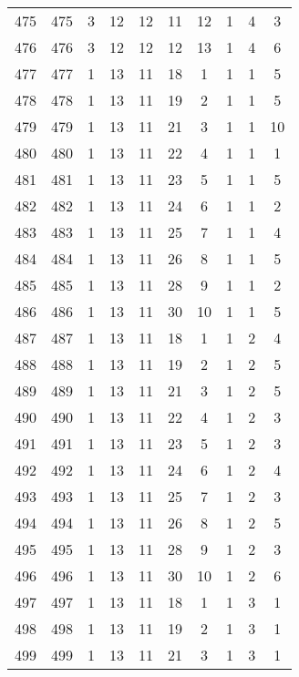 \begin{longtable}{cccccccccc}
  475 & 475 &   3 &  12 &  12 &  11 &  12 &   1 &   4 &   3 \\ 
  476 & 476 &   3 &  12 &  12 &  12 &  13 &   1 &   4 &   6 \\ 
  477 & 477 &   1 &  13 &  11 &  18 &   1 &   1 &   1 &   5 \\ 
  478 & 478 &   1 &  13 &  11 &  19 &   2 &   1 &   1 &   5 \\ 
  479 & 479 &   1 &  13 &  11 &  21 &   3 &   1 &   1 &  10 \\ 
  480 & 480 &   1 &  13 &  11 &  22 &   4 &   1 &   1 &   1 \\ 
  481 & 481 &   1 &  13 &  11 &  23 &   5 &   1 &   1 &   5 \\ 
  482 & 482 &   1 &  13 &  11 &  24 &   6 &   1 &   1 &   2 \\ 
  483 & 483 &   1 &  13 &  11 &  25 &   7 &   1 &   1 &   4 \\ 
  484 & 484 &   1 &  13 &  11 &  26 &   8 &   1 &   1 &   5 \\ 
  485 & 485 &   1 &  13 &  11 &  28 &   9 &   1 &   1 &   2 \\ 
  486 & 486 &   1 &  13 &  11 &  30 &  10 &   1 &   1 &   5 \\ 
  487 & 487 &   1 &  13 &  11 &  18 &   1 &   1 &   2 &   4 \\ 
  488 & 488 &   1 &  13 &  11 &  19 &   2 &   1 &   2 &   5 \\ 
  489 & 489 &   1 &  13 &  11 &  21 &   3 &   1 &   2 &   5 \\ 
  490 & 490 &   1 &  13 &  11 &  22 &   4 &   1 &   2 &   3 \\ 
  491 & 491 &   1 &  13 &  11 &  23 &   5 &   1 &   2 &   3 \\ 
  492 & 492 &   1 &  13 &  11 &  24 &   6 &   1 &   2 &   4 \\ 
  493 & 493 &   1 &  13 &  11 &  25 &   7 &   1 &   2 &   3 \\ 
  494 & 494 &   1 &  13 &  11 &  26 &   8 &   1 &   2 &   5 \\ 
  495 & 495 &   1 &  13 &  11 &  28 &   9 &   1 &   2 &   3 \\ 
  496 & 496 &   1 &  13 &  11 &  30 &  10 &   1 &   2 &   6 \\ 
  497 & 497 &   1 &  13 &  11 &  18 &   1 &   1 &   3 &   1 \\ 
  498 & 498 &   1 &  13 &  11 &  19 &   2 &   1 &   3 &   1 \\ 
  499 & 499 &   1 &  13 &  11 &  21 &   3 &   1 &   3 &   1 \\ 

\end{longtable}
